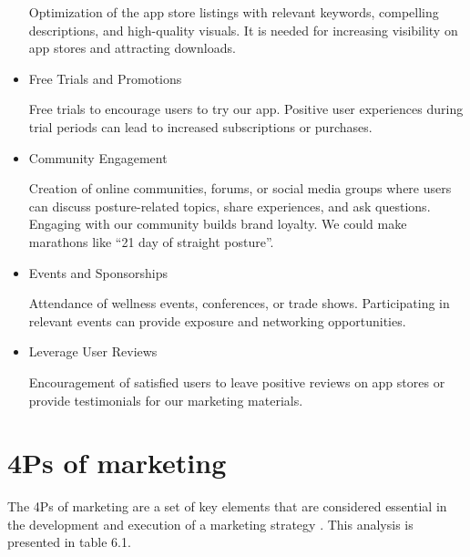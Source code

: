\begin{itemize}
    Optimization of the app store listings with relevant keywords, compelling descriptions, and high-quality visuals. It is needed for increasing visibility on app stores and attracting downloads.
    \item Free Trials and Promotions

    Free trials to encourage users to try our app. Positive user experiences during trial periods can lead to increased subscriptions or purchases.
    \item Community Engagement

    Creation of online communities, forums, or social media groups where users can discuss posture-related topics, share experiences, and ask questions. Engaging with our community builds brand loyalty. We could make marathons like “21 day of straight posture”.
    \item Events and Sponsorships

    Attendance of wellness events, conferences, or trade shows. Participating in relevant events can provide exposure and networking opportunities.
    \item Leverage User Reviews

    Encouragement of satisfied users to leave positive reviews on app stores or provide testimonials for our marketing materials. 
\end{itemize}

\section{4Ps of marketing}

The 4Ps of marketing are a set of key elements that are considered essential in the development and execution of a marketing strategy \cite{4PsofMarketing}. This analysis is presented in table 6.1.

